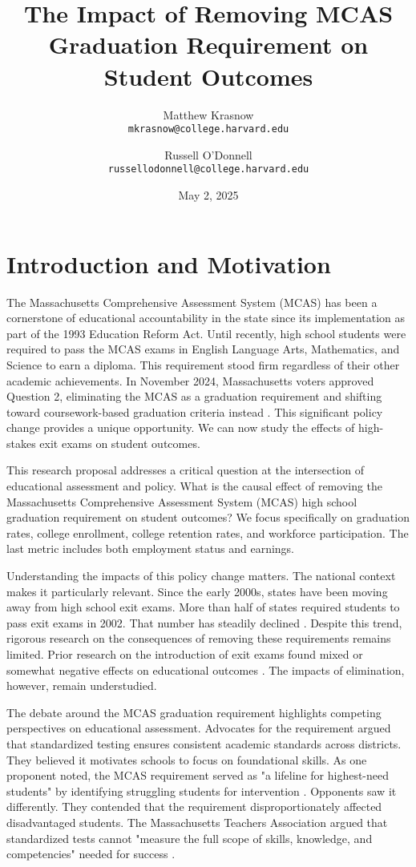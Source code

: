 \documentclass[12pt]{article}
\title{The Impact of Removing MCAS Graduation Requirement on Student Outcomes}
\author{Matthew Krasnow \\ \texttt{mkrasnow@college.harvard.edu} \and Russell O'Donnell \\ \texttt{russellodonnell@college.harvard.edu}}
\date{May 2, 2025}
\begin{document}
\maketitle

\section{Introduction and Motivation}

The Massachusetts Comprehensive Assessment System (MCAS) has been a cornerstone of educational accountability in the state since its implementation as part of the 1993 Education Reform Act. Until recently, high school students were required to pass the MCAS exams in English Language Arts, Mathematics, and Science to earn a diploma. This requirement stood firm regardless of their other academic achievements. In November 2024, Massachusetts voters approved Question 2, eliminating the MCAS as a graduation requirement and shifting toward coursework-based graduation criteria instead \citep{boston2024}. This significant policy change provides a unique opportunity. We can now study the effects of high-stakes exit exams on student outcomes.

This research proposal addresses a critical question at the intersection of educational assessment and policy. What is the causal effect of removing the Massachusetts Comprehensive Assessment System (MCAS) high school graduation requirement on student outcomes? We focus specifically on graduation rates, college enrollment, college retention rates, and workforce participation. The last metric includes both employment status and earnings.

Understanding the impacts of this policy change matters. The national context makes it particularly relevant. Since the early 2000s, states have been moving away from high school exit exams. More than half of states required students to pass exit exams in 2002. That number has steadily declined \citep{bostonglobe2024}. Despite this trend, rigorous research on the consequences of removing these requirements remains limited. Prior research on the introduction of exit exams found mixed or somewhat negative effects on educational outcomes \citep{caves2018}. The impacts of elimination, however, remain understudied.

The debate around the MCAS graduation requirement highlights competing perspectives on educational assessment. Advocates for the requirement argued that standardized testing ensures consistent academic standards across districts. They believed it motivates schools to focus on foundational skills. As one proponent noted, the MCAS requirement served as "a lifeline for highest-need students" by identifying struggling students for intervention \citep{rhodeisland2023}. Opponents saw it differently. They contended that the requirement disproportionately affected disadvantaged students. The Massachusetts Teachers Association argued that standardized tests cannot "measure the full scope of skills, knowledge, and competencies" needed for success \citep{boston2024}.
\end{document}
